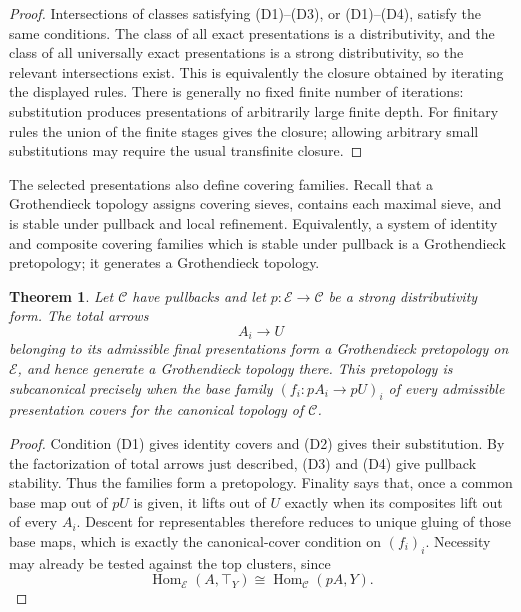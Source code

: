 \documentclass[12pt,oneside,reqno]{amsart}
\newtheorem{theorem}{Theorem}[section]
\theoremstyle{definition}
\theoremstyle{remark}
\newcommand{\C}{\mathcal C}
\begin{document}
\begin{proof}
Intersections of classes satisfying (D1)--(D3), or (D1)--(D4), satisfy
the same conditions.  The class of all exact presentations is a
distributivity, and the class of all universally exact presentations is
a strong distributivity, so the relevant intersections exist.  This is
equivalently the closure obtained by iterating the displayed rules.
There is generally no fixed finite number of iterations: substitution
produces presentations of arbitrarily large finite depth.  For finitary
rules the union of the finite stages gives the closure; allowing
arbitrary small substitutions may require the usual transfinite closure.
\end{proof}

The selected presentations also define covering families.  Recall that
a Grothendieck topology assigns covering sieves, contains each maximal
sieve, and is stable under pullback and local refinement.  Equivalently,
a system of identity and composite covering families which is stable
under pullback is a Grothendieck pretopology; it generates a
Grothendieck topology.

\begin{theorem}\label{thm:strong-total-site}
Let \(\C\) have pullbacks and let \(p:\mathcal E\to\C\) be a strong
distributivity form.  The total arrows
\[
                  A_i\longrightarrow U
\]
belonging to its admissible final presentations form a Grothendieck
pretopology on \(\mathcal E\), and hence generate a Grothendieck topology
there.  This pretopology is subcanonical precisely when the base family
\((f_i:pA_i\to pU)_i\) of every admissible presentation covers for the
canonical topology of \(\C\).
\end{theorem}

\begin{proof}
Condition (D1) gives identity covers and (D2) gives their substitution.
By the factorization of total arrows just described, (D3) and (D4) give
pullback stability.  Thus the families form a pretopology.  Finality
says that, once a common base map out of \(pU\) is given, it lifts out of
\(U\) exactly when its composites lift out of every \(A_i\).  Descent
for representables therefore reduces to unique gluing of those base
maps, which is exactly the canonical-cover condition on \((f_i)_i\).
Necessity may already be tested against the top clusters, since
\[
 \operatorname{Hom}_{\mathcal E}(A,\top_Y)
     \cong\operatorname{Hom}_{\C}(pA,Y).
\]
\end{proof}
\end{document}
